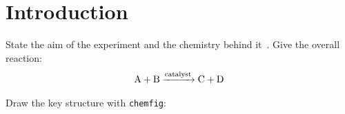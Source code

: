 \section{Introduction}
\label{sec:intro}

State the aim of the experiment and the chemistry behind it~\cite{clayden2012}.
Give the overall reaction:
\begin{equation}
  \ce{A + B ->[catalyst] C + D}
  \label{eq:reaction}
\end{equation}

Draw the key structure with \texttt{chemfig}:
\begin{center}
\end{center}
